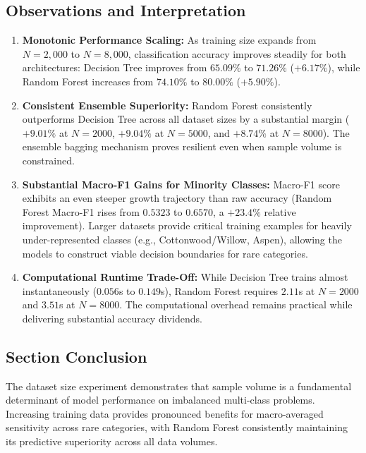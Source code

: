 \subsection{Observations and Interpretation}
\begin{enumerate}
    \item \textbf{Monotonic Performance Scaling:} As training size expands from $N = 2,000$ to $N = 8,000$, classification accuracy improves steadily for both architectures: Decision Tree improves from $65.09\%$ to $71.26\%$ ($+6.17\%$), while Random Forest increases from $74.10\%$ to $80.00\%$ ($+5.90\%$).
    \item \textbf{Consistent Ensemble Superiority:} Random Forest consistently outperforms Decision Tree across all dataset sizes by a substantial margin ($+9.01\%$ at $N=2000$, $+9.04\%$ at $N=5000$, and $+8.74\%$ at $N=8000$). The ensemble bagging mechanism proves resilient even when sample volume is constrained.
    \item \textbf{Substantial Macro-F1 Gains for Minority Classes:} Macro-F1 score exhibits an even steeper growth trajectory than raw accuracy (Random Forest Macro-F1 rises from $0.5323$ to $0.6570$, a $+23.4\%$ relative improvement). Larger datasets provide critical training examples for heavily under-represented classes (e.g., Cottonwood/Willow, Aspen), allowing the models to construct viable decision boundaries for rare categories.
    \item \textbf{Computational Runtime Trade-Off:} While Decision Tree trains almost instantaneously ($0.056$s to $0.149$s), Random Forest requires $2.11$s at $N=2000$ and $3.51$s at $N=8000$. The computational overhead remains practical while delivering substantial accuracy dividends.
\end{enumerate}

\subsection{Section Conclusion}
The dataset size experiment demonstrates that sample volume is a fundamental determinant of model performance on imbalanced multi-class problems. Increasing training data provides pronounced benefits for macro-averaged sensitivity across rare categories, with Random Forest consistently maintaining its predictive superiority across all data volumes.

